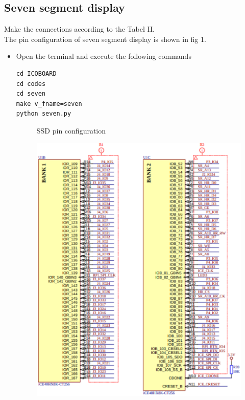 \documentclass[journal,12pt,twocolumn]{IEEEtran}
\begin{document}
\subsection{Seven segment display}
Make the connections according to the Tabel II.\\
The pin configuration of seven segment display is shown in fig 1.
\begin{table}[!h]
\centering

\caption{}
\label{table:components}
\end{table}
\begin{itemize}
\item Open the terminal and execute the following commands
\begin{lstlisting}
cd ICOBOARD
cd codes
cd seven
make v_fname=seven
python seven.py
\end{lstlisting}
\begin{figure}[!h]
\centering

\caption{SSD pin configuration}
\label{fig:arduino}
\end{figure}
\begin{figure}[!h]
\centering
\includegraphics[scale=0.5]{./tabel/icoboard2.eps}

\end{figure}
\end{itemize}
\end{document}
